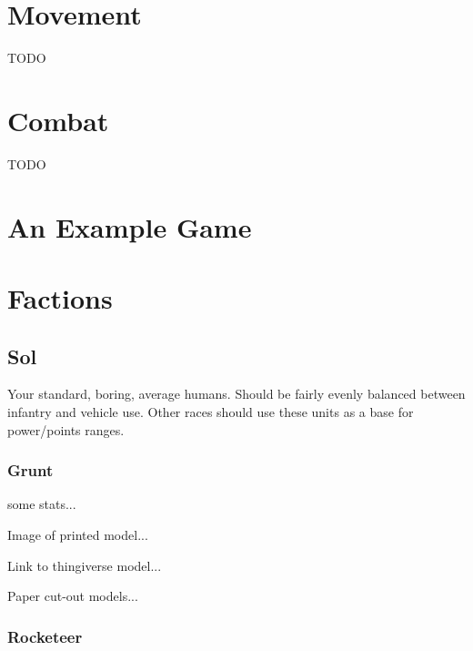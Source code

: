 \documentclass{article}
\begin{document}
\section{Movement}
TODO

\section{Combat}
TODO

\section{An Example Game}

\section{Factions}
\subsection{Sol}
Your standard, boring, average humans. Should be fairly evenly balanced between infantry and vehicle use.  Other races should use these units as a base for power/points ranges.

\subsubsection{Grunt}

some stats...

Image of printed model...

Link to thingiverse model...

Paper cut-out models...

\subsubsection{Rocketeer}
\end{document}

